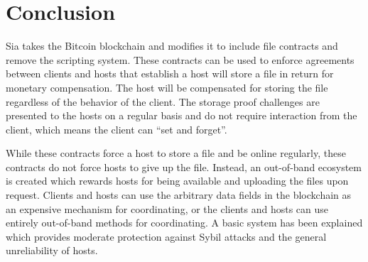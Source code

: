 \documentclass[twocolumn]{article}
\begin{document}



\section{Conclusion}
Sia takes the Bitcoin blockchain and modifies it to include file contracts and remove the scripting system.
These contracts can be used to enforce agreements between clients and hosts that establish a host will store a file in return for monetary compensation.
The host will be compensated for storing the file regardless of the behavior of the client.
The storage proof challenges are presented to the hosts on a regular basis and do not require interaction from the client, which means the client can ``set and forget''.

While these contracts force a host to store a file and be online regularly, these contracts do not force hosts to give up the file.
Instead, an out-of-band ecosystem is created which rewards hosts for being available and uploading the files upon request.
Clients and hosts can use the arbitrary data fields in the blockchain as an expensive mechanism for coordinating, or the clients and hosts can use entirely out-of-band methods for coordinating.
A basic system has been explained which provides moderate protection against Sybil attacks and the general unreliability of hosts.
\end{document}
